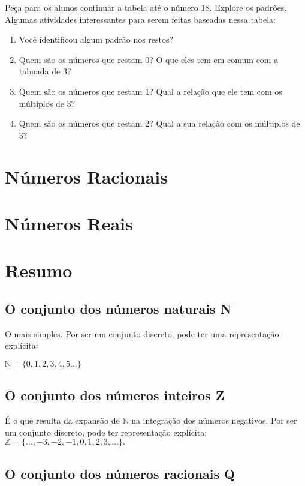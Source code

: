 Peça para os alunos continuar a tabela até o número 18. Explore os padrões.
Algumas atividades interessantes para serem feitas baseadas nessa tabela:
\newpage
\begin{enumerate}

 \item Você identificou algum padrão nos restos?
 \item Quem são os números que restam 0? O que eles tem em comum com a tabuada de 3?
 \item Quem são os números que restam 1? Qual a relação que ele tem com os múltiplos de 3?
 \item Quem são os números que restam 2? Qual a sua relação com os múltiplos de 3?
\end{enumerate}

\section{Números Racionais}

\section{Números Reais}


\section{Resumo}

\subsection{O conjunto dos números naturais N}

O mais simples. Por ser um conjunto discreto, pode ter uma representação explícita:

$\mathbb{N} = \{0, 1, 2, 3, 4, 5 \dots\}$
 
\subsection{O conjunto dos números inteiros Z}

É o que resulta da expansão de $\mathbb{N}$ na integração dos números negativos. Por ser um conjunto discreto, pode ter representação explícita: $\mathbb{Z} = \{\dots,-3, -2, -1, 0, 1, 2, 3,\dots\}.$
 
\subsection{O conjunto dos números racionais Q}

